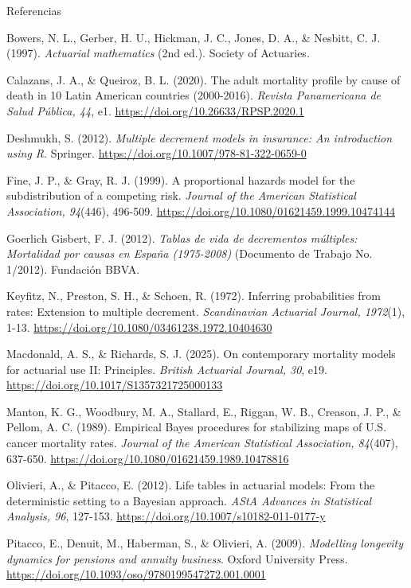 \documentclass[12pt,aspectratio=169]{beamer}
\newcommand{\aparef}[1]{%
  \par\begingroup
  \leftskip=5mm
  \noindent\hspace*{-5mm}#1\par
  \endgroup\vspace{0.16mm}%
}
\begin{document}
\begin{frame}[t,noframenumbering]{Referencias}
  \vspace{-5.8mm}
  \begingroup
  \RaggedRight
  \begin{list}{}{%
    \setlength{\leftmargin}{-5.5mm}%
    \setlength{\rightmargin}{-5.5mm}%
    \setlength{\topsep}{0pt}%
    \setlength{\partopsep}{0pt}%
    \setlength{\parsep}{0pt}%
    \setlength{\itemsep}{0pt}%
  }
  \item[]\fontsize{6.7}{7.25}\selectfont
  \aparef{Bowers, N. L., Gerber, H. U., Hickman, J. C., Jones, D. A., \& Nesbitt, C. J. (1997). \textit{Actuarial mathematics} (2nd ed.). Society of Actuaries.}
  \aparef{Calazans, J. A., \& Queiroz, B. L. (2020). The adult mortality profile by cause of death in 10 Latin American countries (2000-2016). \textit{Revista Panamericana de Salud Pública, 44}, e1. \url{https://doi.org/10.26633/RPSP.2020.1}}
  \aparef{Deshmukh, S. (2012). \textit{Multiple decrement models in insurance: An introduction using R}. Springer. \url{https://doi.org/10.1007/978-81-322-0659-0}}
  \aparef{Fine, J. P., \& Gray, R. J. (1999). A proportional hazards model for the subdistribution of a competing risk. \textit{Journal of the American Statistical Association, 94}(446), 496-509. \url{https://doi.org/10.1080/01621459.1999.10474144}}
  \aparef{Goerlich Gisbert, F. J. (2012). \textit{Tablas de vida de decrementos múltiples: Mortalidad por causas en España (1975-2008)} (Documento de Trabajo No. 1/2012). Fundación BBVA.}
  \aparef{Keyfitz, N., Preston, S. H., \& Schoen, R. (1972). Inferring probabilities from rates: Extension to multiple decrement. \textit{Scandinavian Actuarial Journal, 1972}(1), 1-13. \url{https://doi.org/10.1080/03461238.1972.10404630}}
  \aparef{Macdonald, A. S., \& Richards, S. J. (2025). On contemporary mortality models for actuarial use II: Principles. \textit{British Actuarial Journal, 30}, e19. \url{https://doi.org/10.1017/S1357321725000133}}
  \aparef{Manton, K. G., Woodbury, M. A., Stallard, E., Riggan, W. B., Creason, J. P., \& Pellom, A. C. (1989). Empirical Bayes procedures for stabilizing maps of U.S. cancer mortality rates. \textit{Journal of the American Statistical Association, 84}(407), 637-650. \url{https://doi.org/10.1080/01621459.1989.10478816}}
  \aparef{Olivieri, A., \& Pitacco, E. (2012). Life tables in actuarial models: From the deterministic setting to a Bayesian approach. \textit{AStA Advances in Statistical Analysis, 96}, 127-153. \url{https://doi.org/10.1007/s10182-011-0177-y}}
  \aparef{Pitacco, E., Denuit, M., Haberman, S., \& Olivieri, A. (2009). \textit{Modelling longevity dynamics for pensions and annuity business}. Oxford University Press. \url{https://doi.org/10.1093/oso/9780199547272.001.0001}}

\end{list}
\end{frame}
\end{document}
